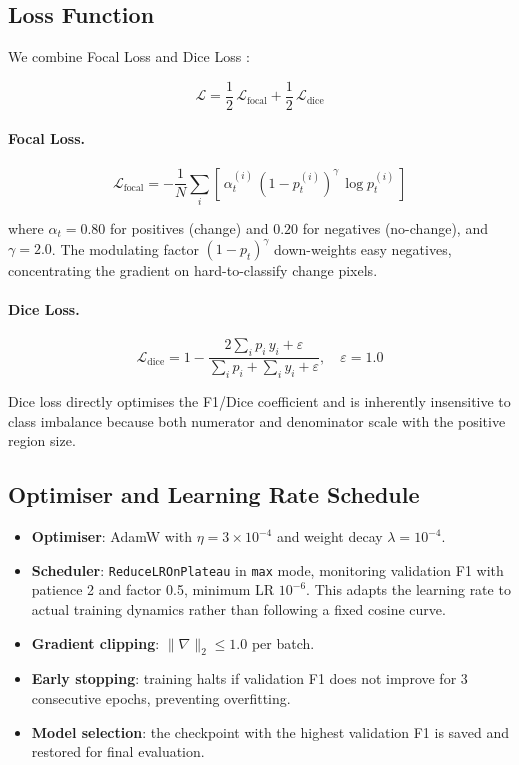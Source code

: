 \documentclass[12pt,a4paper]{article}
\begin{document}
\subsection{Loss Function}

We combine Focal Loss \citep{lin2017focal} and Dice Loss \citep{milletari2016vnet}:

\[
\mathcal{L} = \frac{1}{2}\,\mathcal{L}_{\text{focal}} + \frac{1}{2}\,\mathcal{L}_{\text{dice}}
\]

\paragraph{Focal Loss.}

\[
\mathcal{L}_{\text{focal}} = -\frac{1}{N}\sum_i
  \left[\,\alpha_t^{(i)}\,(1-p_t^{(i)})^{\gamma}\,\log p_t^{(i)}\,\right]
\]

where $\alpha_t = 0.80$ for positives (change) and $0.20$ for negatives (no-change), and
$\gamma = 2.0$.  The modulating factor $(1-p_t)^\gamma$ down-weights easy negatives,
concentrating the gradient on hard-to-classify change pixels.

\paragraph{Dice Loss.}

\[
\mathcal{L}_{\text{dice}} = 1 -
  \frac{2\sum_i p_i\,y_i + \varepsilon}{\sum_i p_i + \sum_i y_i + \varepsilon}, \quad
  \varepsilon=1.0
\]

Dice loss directly optimises the F1/Dice coefficient and is inherently insensitive to
class imbalance because both numerator and denominator scale with the positive region
size.

\subsection{Optimiser and Learning Rate Schedule}

\begin{itemize}[leftmargin=*]
  \item \textbf{Optimiser}: AdamW \citep{loshchilov2018decoupled} with $\eta=3\times10^{-4}$
    and weight decay $\lambda=10^{-4}$.
  \item \textbf{Scheduler}: \texttt{ReduceLROnPlateau} in \texttt{max} mode, monitoring
    validation F1 with patience 2 and factor 0.5, minimum LR $10^{-6}$.  This adapts the
    learning rate to actual training dynamics rather than following a fixed cosine curve.
  \item \textbf{Gradient clipping}: $\|\nabla\|_2 \leq 1.0$ per batch.
  \item \textbf{Early stopping}: training halts if validation F1 does not improve for 3
    consecutive epochs, preventing overfitting.
  \item \textbf{Model selection}: the checkpoint with the highest validation F1 is saved
    and restored for final evaluation.
\end{itemize}
\end{document}
